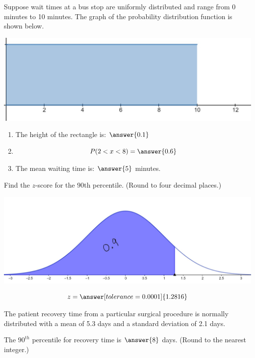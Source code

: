 \documentclass{ximera}
\begin{document}
\begin{problem}\label{prob:exam2prob5}
Suppose wait times at a bus stop are uniformly distributed and range from 0 minutes to 10 minutes.  The graph of the probability distribution function is shown below.
\begin{image}
\includegraphics{test2waittime.jpg}
\end{image}
\begin{enumerate}
    \item The height of the rectangle is: $\answer{0.1}$
    \item 
    $$P(2<x<8)=\answer{0.6}$$
    \item 
    The mean waiting time is: $\answer{5}$ minutes.
\end{enumerate}
\end{problem}

\begin{problem}\label{prob:exam2prob6}
Find the $z$-score for the $90$th percentile.  (Round to four decimal places.)
\begin{image}
\includegraphics{test290thpercentile.jpg}
\end{image}
$$z=\answer[tolerance=0.0001]{1.2816}$$
\end{problem}

\begin{problem}\label{prob:exam2prob7}
The patient recovery time from a particular surgical
procedure is normally distributed with a mean of 5.3 days and a standard deviation of 2.1 days.  

The $90^{th}$ percentile for recovery time is $\answer{8}$ days. (Round to the nearest integer.)
\end{problem}
\end{document}
